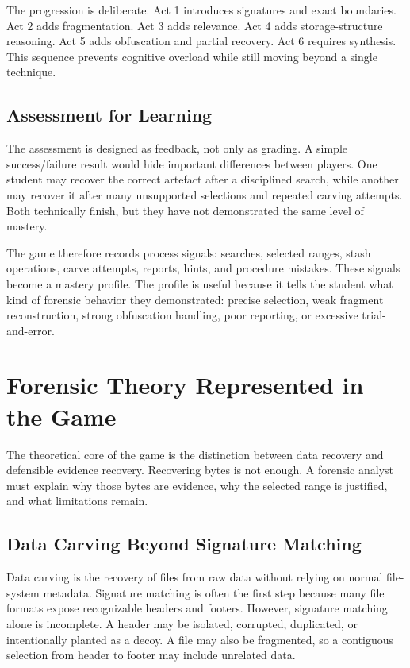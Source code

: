 \documentclass[11pt,a4paper]{article}
\begin{document}
The progression is deliberate. Act 1 introduces signatures and exact boundaries. Act 2 adds fragmentation. Act 3 adds relevance. Act 4 adds storage-structure reasoning. Act 5 adds obfuscation and partial recovery. Act 6 requires synthesis. This sequence prevents cognitive overload while still moving beyond a single technique.

\subsection{Assessment for Learning}

The assessment is designed as feedback, not only as grading. A simple success/failure result would hide important differences between players. One student may recover the correct artefact after a disciplined search, while another may recover it after many unsupported selections and repeated carving attempts. Both technically finish, but they have not demonstrated the same level of mastery.

The game therefore records process signals: searches, selected ranges, stash operations, carve attempts, reports, hints, and procedure mistakes. These signals become a mastery profile. The profile is useful because it tells the student what kind of forensic behavior they demonstrated: precise selection, weak fragment reconstruction, strong obfuscation handling, poor reporting, or excessive trial-and-error.

\section{Forensic Theory Represented in the Game}

The theoretical core of the game is the distinction between data recovery and defensible evidence recovery. Recovering bytes is not enough. A forensic analyst must explain why those bytes are evidence, why the selected range is justified, and what limitations remain.

\subsection{Data Carving Beyond Signature Matching}

Data carving is the recovery of files from raw data without relying on normal file-system metadata. Signature matching is often the first step because many file formats expose recognizable headers and footers. However, signature matching alone is incomplete. A header may be isolated, corrupted, duplicated, or intentionally planted as a decoy. A file may also be fragmented, so a contiguous selection from header to footer may include unrelated data.
\end{document}
